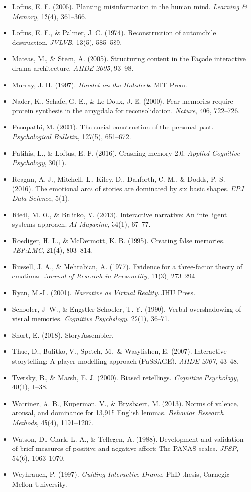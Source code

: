 \documentclass[11pt, a4paper]{article}
\begin{document}
\begin{itemize}
  \item Loftus, E. F. (2005). Planting misinformation in the human mind. \textit{Learning \& Memory}, 12(4), 361--366.
  \item Loftus, E. F., \& Palmer, J. C. (1974). Reconstruction of automobile destruction. \textit{JVLVB}, 13(5), 585--589.
  \item Mateas, M., \& Stern, A. (2005). Structuring content in the Façade interactive drama architecture. \textit{AIIDE 2005}, 93--98.
  \item Murray, J. H. (1997). \textit{Hamlet on the Holodeck}. MIT Press.
  \item Nader, K., Schafe, G. E., \& Le Doux, J. E. (2000). Fear memories require protein synthesis in the amygdala for reconsolidation. \textit{Nature}, 406, 722--726.
  \item Pasupathi, M. (2001). The social construction of the personal past. \textit{Psychological Bulletin}, 127(5), 651--672.
  \item Patihis, L., \& Loftus, E. F. (2016). Crashing memory 2.0. \textit{Applied Cognitive Psychology}, 30(1).
  \item Reagan, A. J., Mitchell, L., Kiley, D., Danforth, C. M., \& Dodds, P. S. (2016). The emotional arcs of stories are dominated by six basic shapes. \textit{EPJ Data Science}, 5(1).
  \item Riedl, M. O., \& Bulitko, V. (2013). Interactive narrative: An intelligent systems approach. \textit{AI Magazine}, 34(1), 67--77.
  \item Roediger, H. L., \& McDermott, K. B. (1995). Creating false memories. \textit{JEP:LMC}, 21(4), 803--814.
  \item Russell, J. A., \& Mehrabian, A. (1977). Evidence for a three-factor theory of emotions. \textit{Journal of Research in Personality}, 11(3), 273--294.
  \item Ryan, M.-L. (2001). \textit{Narrative as Virtual Reality}. JHU Press.
  \item Schooler, J. W., \& Engstler-Schooler, T. Y. (1990). Verbal overshadowing of visual memories. \textit{Cognitive Psychology}, 22(1), 36--71.
  \item Short, E. (2018). StoryAssembler.
  \item Thue, D., Bulitko, V., Spetch, M., \& Wasylishen, E. (2007). Interactive storytelling: A player modelling approach (PaSSAGE). \textit{AIIDE 2007}, 43--48.
  \item Tversky, B., \& Marsh, E. J. (2000). Biased retellings. \textit{Cognitive Psychology}, 40(1), 1--38.
  \item Warriner, A. B., Kuperman, V., \& Brysbaert, M. (2013). Norms of valence, arousal, and dominance for 13,915 English lemmas. \textit{Behavior Research Methods}, 45(4), 1191--1207.
  \item Watson, D., Clark, L. A., \& Tellegen, A. (1988). Development and validation of brief measures of positive and negative affect: The PANAS scales. \textit{JPSP}, 54(6), 1063--1070.
  \item Weyhrauch, P. (1997). \textit{Guiding Interactive Drama}. PhD thesis, Carnegie Mellon University.
\end{itemize}
\end{document}
